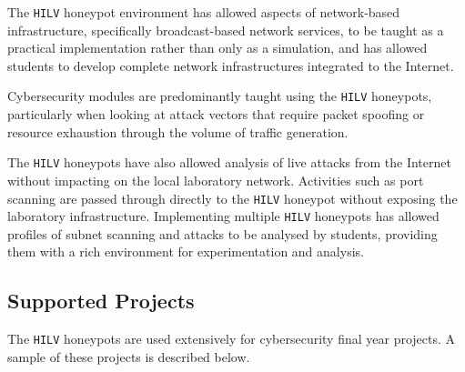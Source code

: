 \documentclass[10pt,journal]{IEEEtran}
\begin{document}
The \texttt{HILV} honeypot environment has allowed aspects of network-based
infrastructure, specifically broadcast-based network services, to be taught as
a practical implementation rather than only as a simulation, and has allowed
students to develop complete network infrastructures integrated to the
Internet.

Cybersecurity modules are predominantly taught using the \texttt{HILV}
honeypots, particularly when looking at attack vectors that require packet
spoofing or resource exhaustion through the volume of traffic generation.

The \texttt{HILV} honeypots have also allowed analysis of live attacks from the
Internet without impacting on the local laboratory network. Activities such as
port scanning are passed through directly to the \texttt{HILV} honeypot without
exposing the laboratory infrastructure. Implementing multiple \texttt{HILV}
honeypots has allowed profiles of subnet scanning and attacks to be analysed by
students, providing them with a rich environment for experimentation and
analysis.

\subsection{Supported Projects\label{Projects}}

The \texttt{HILV} honeypots are used extensively for cybersecurity final year
projects. A sample of these projects is described below.
\end{document}

